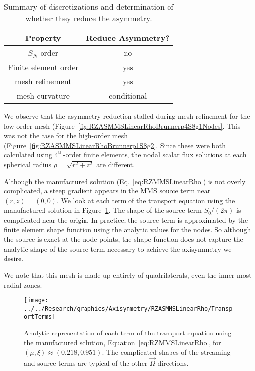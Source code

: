 \documentclass[12pt]{article}
\begin{document}
\begin{table}[!htb]
\begin{tabular}{|c|c|}
\hline
Property & Reduce Asymmetry? \\\hline
$S_N$ order & no \\\hline
Finite element order & yes \\\hline
mesh refinement & yes \\\hline
mesh curvature & conditional \\\hline
\end{tabular}
\caption{Summary of discretizations and determination of whether they reduce the asymmetry.}
\label{tab:AxisymmetrySummary}
\end{table}

We observe that the asymmetry reduction stalled during mesh refinement for the low-order mesh (Figure~\ref{fig:RZASMMSLinearRhoBrunnerp4S8g1Nodes}. This was not the case for the high-order mesh (Figure~\ref{fig:RZASMMSLinearRhoBrunnerp1S8g2}. Since these were both calculated using $4^\text{th}$-order finite elements, the nodal scalar flux solutions at each spherical radius $\rho=\sqrt{r^2+z^2}$ are different.


Although the manufactured solution (Eq.~\ref{eq:RZMMSLinearRho}) is not overly complicated, a steep gradient appears in the MMS source term near $(r,z)=(0,0)$. We look at each term of the transport equation using the manufactured solution in Figure~\ref{fig:RZMMSLinearRhoAnalytic}. The shape of the source term $S_0/(2 \pi)$ is complicated near the origin. In practice, the source term is approximated by the finite element shape function using the analytic values for the nodes. So although the source is exact at the node points, the shape function does not capture the analytic shape of the source term necessary to achieve the axisymmetry we desire.

We note that this mesh is made up entirely of quadrilaterals, even the inner-most radial zones.

\begin{figure}
\texttt{[image: ../../Research/graphics/Axisymmetry/RZASMMSLinearRho/TransportTerms]}
\caption{Analytic representation of each term of the transport equation using the manufactured solution, Equation~\ref{eq:RZMMSLinearRho}, for $(\mu,\xi) \approx (0.218,0.951)$. The complicated shapes of the streaming and source terms are typical of the other $\vec{\Omega}$ directions.}
\label{fig:RZMMSLinearRhoAnalytic}
\end{figure}
\end{document}

